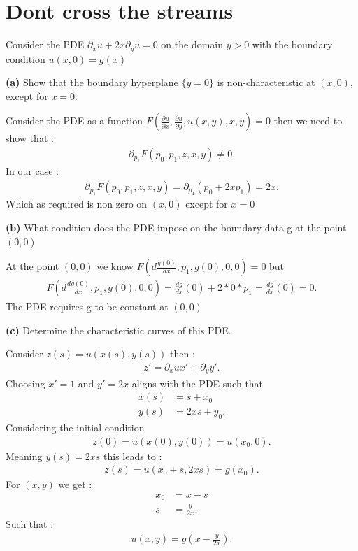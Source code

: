 \section{Dont cross the streams}
Consider the PDE $\partial_x u + 2x\partial_y u  = 0$ on the domain $y>0$ with the boundary condition $u(x,0) = g(x)$
\begin{question}
  \textbf{(a)} Show that the boundary hyperplane $\{y=0\}  $ is non-characteristic at $(x,0)$, except for $x=0$.
\end{question}
\begin{solution}
Consider the PDE as a function $F(\frac{\partial u}{\partial x},\frac{\partial u}{\partial y},u(x,y),x,y)=0$   then we need to show that : 
\begin{align*}
  \partial_{p_{1}} F(p_{0},p_{1},z,x,y) \neq 0
.\end{align*}
In our case : 
\begin{align*} 
  \partial_{p_{1}} F(p_{0},p_{1},z,x,y)  = \partial_{p_{1}} \left( p_{0} + 2x p_{1} \right)   = 2x
.\end{align*}
Which as required is non zero on $(x,0)$ except for $x=0$
\end{solution}
\begin{question}
  \textbf{(b)}  What condition does the PDE impose on the boundary data g at the point $(0,0)$
\end{question}
\begin{solution}
 At the point $(0,0)$ we know $F(d \frac{g(0)}{dx},p_{1},g(0),0,0) = 0$ but 
 \begin{align*}
  F(d \frac{dg(0)}{dx},p_{1},g(0),0,0) = \frac{dg}{dx}(0) + 2*0*p_{1} =  \frac{dg}{dx}(0) = 0
 .\end{align*}
 The PDE requires g to be constant at $(0,0)$
\end{solution}
\begin{question}
  \textbf{(c)} Determine the characteristic curves of this PDE.
\end{question}
\begin{solution}
 Consider $z(s) = u(x(s),y(s))$  then : 
 \begin{align*}
   z'  = \partial_x u x' + \partial_y y' 
 .\end{align*}
 Choosing $x' = 1 $ and $y' =  2x$ aligns with the PDE such that  
 \begin{align*}
   x(s) &= s +x_{0} \\
   y(s) &= 2xs + y_{0}
 .\end{align*}
 Considering the initial condition 
 \begin{align*}
  z(0) = u(x(0),y(0)) =  u(x_{0},0)
 .\end{align*}
 Meaning $y(s) = 2xs$ this leads to : 
 \begin{align*}
   z(s) = u(x_{0}+s,2xs) = g(x_{0})
 .\end{align*}
 For $(x,y)$ we get : 
 \begin{align*}
   x_{0} &= x-s  \\
   s     &= \frac{y}{2x}
 .\end{align*}
 Such that : 
 \begin{align*}
  u(x,y)  = g(x-\frac{y}{2x})
 .\end{align*}
\end{solution}
